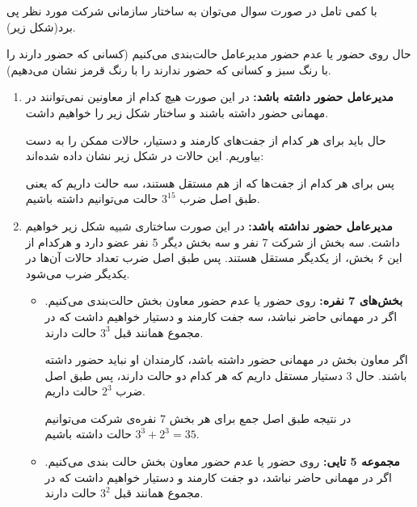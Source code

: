 \p
با کمی تامل در صورت سوال می‌توان به ساختار سازمانی شرکت مورد نظر پی برد(شکل زیر).

\p
{}
\p

حال روی حضور یا عدم حضور مدیرعامل حالت‌بندی می‌کنیم
(کسانی که حضور دارند را با رنگ سبز و کسانی که حضور ندارند را با رنگ قرمز نشان می‌دهیم).
    
\begin{enumerate}
    \item 
    \textbf{مدیرعامل حضور داشته باشد:}
    در این صورت هیچ کدام از معاونین نمی‌توانند در مهمانی حضور داشته باشند و ساختار شکل زیر را خواهیم داشت.

    \p
    \p
        
    حال باید برای هر کدام از جفت‌های کارمند و دستیار، حالات ممکن را به دست بیاوریم. این حالات در شکل زیر نشان داده شده‌اند:

    \p
    \p
    
    پس برای هر کدام از جفت‌ها که از هم مستقل هستند، سه حالت داریم که یعنی طبق اصل ضرب
    $3^{15}$
    حالت می‌توانیم داشته باشیم.
    
    \item 
    \textbf{مدیرعامل حضور نداشته باشد:}
    در این صورت ساختاری شبیه شکل زیر خواهیم داشت. سه بخش از شرکت 7 نفر و سه بخش دیگر 5 نفر عضو دارد و هرکدام از این ۶ بخش، از یکدیگر مستقل هستند. پس طبق اصل ضرب تعداد حالات آن‌ها در یکدیگر ضرب می‌شود.
    
    \p
    \p
    
    \begin{itemize}
        \item 
        \textbf{بخش‌های 7 نفره:}
        روی حضور یا عدم حضور معاون بخش حالت‌بندی می‌کنیم. اگر در مهمانی حاضر نباشد، سه جفت کارمند و دستیار خواهیم داشت که در مجموع همانند قبل
        $3^3$
        حالت دارند.

        \p
        \p
        
        اگر معاون بخش در مهمانی حضور داشته باشد، کارمندان او نباید حضور داشته باشند. حال 3 دستیار مستقل داریم که هر کدام دو حالت دارند، پس طبق اصل ضرب
        $2^3$
        حالت داریم.

        \p
        \p
        
       در نتیجه طبق اصل جمع برای هر بخش 7 نفره‌ی شرکت می‌توانیم $3^3 + 2^3 = 35 $ حالت داشته باشیم.
        
        \item 
        \textbf{مجموعه 5 تایی:}
        روی حضور یا عدم حضور معاون بخش حالت بندی می‌کنیم.
        اگر در مهمانی حاضر نباشد، دو جفت کارمند و دستیار خواهیم داشت  که در مجموع همانند قبل
        $3^2$
        حالت دارند.


\end{itemize}
\end{enumerate}
